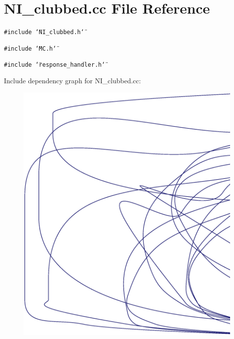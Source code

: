 \section{NI\_\-clubbed.cc File Reference}
\label{NI__clubbed_8cc}
{\tt \#include \char`\"{}NI\_\-clubbed.h\char`\"{}}\par
{\tt \#include \char`\"{}MC.h\char`\"{}}\par
{\tt \#include \char`\"{}response\_\-handler.h\char`\"{}}\par


Include dependency graph for NI\_\-clubbed.cc:\nopagebreak
\begin{figure}[H]
\begin{center}
\leavevmode
\includegraphics[width=420pt]{NI__clubbed_8cc__incl}
\end{center}
\end{figure}
